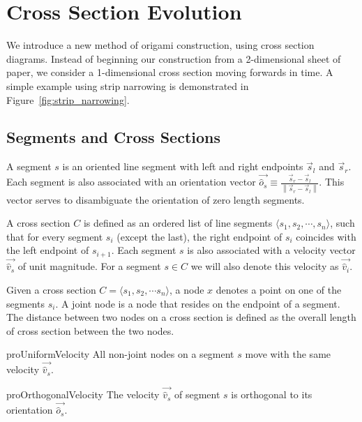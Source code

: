\section{Cross Section Evolution}
\label{sec:cross_sections}

We introduce a new method of origami construction, using cross section diagrams.
Instead of beginning our construction from a 2-dimensional sheet of paper, we
consider a 1-dimensional cross section moving forwards in time. A simple example
using strip narrowing\cite{strip_narrowing} is demonstrated in
Figure~\ref{fig:strip_narrowing}.

\subsection{Segments and Cross Sections}
\label{sec:segments_and_cross_sections}

\begin{definition}
\label{def:segment}
A segment $s$ is an oriented line segment with left and right endpoints $\vec s_l$ and $\vec s_r$.
Each segment is also associated with an orientation vector $\vec{\hat o_s} \equiv\frac{\vec s_r-\vec s_l}{ \left\| \vec s_r-\vec s_l\right\|}$.
This vector serves to disambiguate the orientation of zero length segments.
\end{definition}

\begin{definition}
\label{def:cross_section}
A cross section $C$ is defined as an ordered list of line segments $\langle s_1,s_2,\cdots,s_n\rangle$,
such that for every segment $s_i$ (except the last),
the right endpoint of $s_i$ coincides with the left endpoint of $s_{i+1}$.
Each segment $s$ is also associated with a velocity vector $\vec{\hat v_s}$ of unit magnitude.
For a segment $s\in C$ we will also denote this velocity as $\vec{\hat v_i}$.
\end{definition}

\begin{definition}
\label{def:node}
Given a cross section $C = \langle s_1, s_2,\cdots s_n \rangle$, a node $x$ denotes a point on one of the segments $s_i$.
A joint node is a node that resides on the endpoint of a segment.
The distance between two nodes on a cross section is defined as the overall length of cross section between the two nodes.
\end{definition}

\vspace{-1pc}
\begin{restatable}{pro}{UniformVelocity}
\label{pro:uniform_velocity}
All non-joint nodes on a segment $s$ move with the same velocity $\vec{\hat v_s}$.
\end{restatable}
\vspace{-1pc}

\begin{restatable}{pro}{OrthogonalVelocity}
\label{pro:orthogonal_velocity}
The velocity $\vec{\hat v_s}$ of segment $s$ is orthogonal to its orientation $\vec{\hat o_s}$.
\end{restatable}





%
